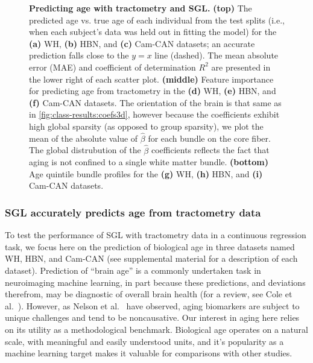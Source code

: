 \documentclass[10pt,%
               aps,%
               prl,%
               preprint,%
               superscriptaddress,%
               preprintnumbers,%
               amsmath,%
               floatfix,%
               endfloats*]{revtex4-1}
\begin{document}
\begin{figure}
    {\label{fig:age-results:wh-coefs3d}}
    {\label{fig:age-results:hbn-coefs3d}}
    {\label{fig:age-results:cc-coefs3d}}
    {\label{fig:age-results:wh-profile}}
    {\label{fig:age-results:hbn-profile}}
    {\label{fig:age-results:cc-profile}}
    \caption{%
        {\bf Predicting age with tractometry and SGL.}
        \label{fig:age-results}
        {\bf (top)} The predicted age vs. true age of each individual from the test
        splits (i.e., when each subject's data was held out in fitting the
        model) for the {\bf (a)} WH, {\bf (b)} HBN, and {\bf (c)} Cam-CAN
        datasets; an accurate prediction falls close to the $y=x$ line
        (dashed). The mean absolute error (MAE) and coefficient of
        determination $R^2$ are presented in the lower right of each scatter
        plot.
        {\bf (middle)} Feature importance for predicting age from tractometry in
        the {\bf (d)} WH, {\bf (e)} HBN, and {\bf (f)} Cam-CAN datasets.
        The orientation of the
        brain is that same as in \cref{fig:class-results:coefs3d}, however because
        the coefficients exhibit high global sparsity (as opposed to group
        sparsity), we plot the mean of the absolute value of $\hat{\beta}$
        for each bundle on the core fiber. The global distrubution of the
        $\hat{\beta}$ coefficients reflects the fact that aging is not
        confined to a single white matter bundle.
        {\bf (bottom)} Age quintile bundle profiles for the {\bf (g)} WH,
        {\bf (h)} HBN, and {\bf (i)} Cam-CAN datasets.
    }
\end{figure}

\subsubsection*{SGL accurately predicts age from tractometry data}

To test the performance of SGL with tractometry data in a continuous
regression task, we focus here on the prediction of biological age in three
datasets named WH, HBN, and Cam-CAN (see supplemental material
\cite{supplement} for a description of each dataset). Prediction of ``brain
age'' is a commonly undertaken task in neuroimaging machine learning, in part
because these predictions, and deviations therefrom, may be diagnostic of
overall brain health (for a review, see Cole et al.~\cite{Cole2019-rz}).
However, as Nelson et al.~\cite{nelson2019biomarkers} have observed, aging
biomarkers are subject to unique challenges and tend to be noncausative. Our
interest in aging here relies on its utility as a methodological benchmark.
Biological age operates on a natural scale, with meaningful and easily
understood units, and it's popularity as a machine learning target makes it
valuable for comparisons with other studies.
\end{document}
